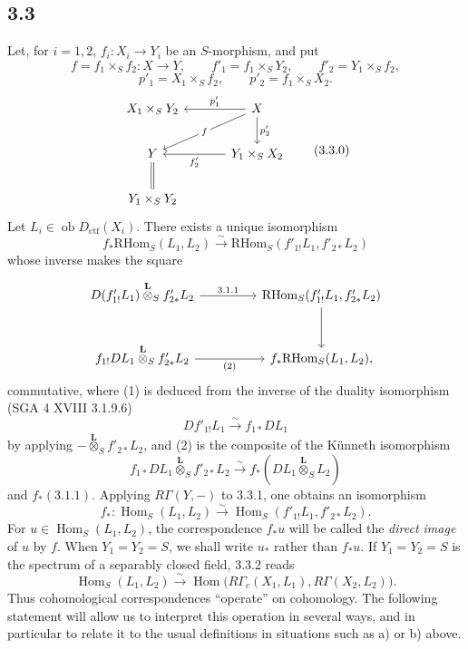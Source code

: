 \documentclass[11pt]{article}
\DeclareMathOperator{\Hom}{Hom}
\newcommand{\ob}{\operatorname{ob}}
\providecommand{\RHom}{\mathrm{RHom}}
\providecommand{\Dctf}{D_{\mathrm{ctf}}}
\providecommand{\Dctf}{D_{\mathrm{ctf}}}
\providecommand{\RHom}{\mathrm{RHom}}
\providecommand{\Hom}{\operatorname{Hom}}
\providecommand{\ob}{\operatorname{ob}}
\providecommand{\RHom}{\mathrm R\mathcal{H}om}
\providecommand{\RHom}{\mathrm{RHom}}
\begin{document}
\subsection*{3.3}
Let, for $i=1,2$, $f_i:X_i\to Y_i$ be an $S$-morphism, and put
\[
f=f_1\times_S f_2:X\to Y,
\qquad
f'_1=f_1\times_S Y_2,
\qquad
f'_2=Y_1\times_S f_2,
\]
\[
p'_1=X_1\times_S f_2,
\qquad
p'_2=f_1\times_S X_2.
\]
\begin{equation}
\begin{tikzcd}[column sep=3.3em,row sep=2.0em]
X_1\times_S Y_2 & X \arrow[l,"p'_1"'] \arrow[dl,"f" description] \arrow[d,"p'_2"] \\
Y & Y_1\times_S X_2 \arrow[l,"f'_2"] \\
Y_1\times_S Y_2 \arrow[u,equal] &
\end{tikzcd}
\tag{3.3.0}
\end{equation}
Let $L_i\in\ob\Dctf(X_i)$. There exists a unique isomorphism
\begin{equation}
f_*\RHom_S(L_1,L_2)
\xrightarrow{\sim}
\RHom_S(f'_{1!}L_1,f'_{2*}L_2)
\tag{3.3.1}
\end{equation}
whose inverse makes the square
\[
\begin{tikzcd}[column sep=4.5em,row sep=2.6em]
D(f'_{1!}L_1)\overset{\mathbf L}{\otimes}_S f'_{2*}L_2
  \arrow[r,"3.1.1"] 
& \RHom_S(f'_{1!}L_1,f'_{2*}L_2) \arrow[d] \\
f_{1!}DL_1\overset{\mathbf L}{\otimes}_S f'_{2*}L_2
  \arrow[r,"(2)"']
& f_*\RHom_S(L_1,L_2),
\end{tikzcd}
\]
commutative, where (1) is deduced from the inverse of the duality isomorphism (SGA 4 XVIII 3.1.9.6)
\[
Df'_{1!}L_1\xrightarrow{\sim}f_{1*}DL_1
\]
by applying $-\overset{\mathbf L}{\otimes}_S f'_{2*}L_2$, and (2) is the composite of the Künneth isomorphism
\[
f_{1*}DL_1\overset{\mathbf L}{\otimes}_S f'_{2*}L_2
\xrightarrow{\sim}
f_*(DL_1\overset{\mathbf L}{\otimes}_S L_2)
\]
and $f_*(3.1.1)$. Applying $R\Gamma(Y,-)$ to 3.3.1, one obtains an isomorphism
\begin{equation}
f_*:\Hom_S(L_1,L_2)
\xrightarrow{\sim}
\Hom_S(f'_{1!}L_1,f'_{2*}L_2).
\tag{3.3.2}
\end{equation}
For $u\in\Hom_S(L_1,L_2)$, the correspondence $f_*u$ will be called the \emph{direct image} of $u$ by $f$. When $Y_1=Y_2=S$, we shall write $u_*$ rather than $f_*u$. If $Y_1=Y_2=S$ is the spectrum of a separably closed field, 3.3.2 reads
\begin{equation}
\Hom_S(L_1,L_2)
\xrightarrow{\sim}
\Hom\bigl(R\Gamma_c(X_1,L_1),R\Gamma(X_2,L_2)\bigr).
\tag{3.3.3}
\end{equation}
Thus cohomological correspondences ``operate'' on cohomology. The following statement will allow us to interpret this operation in several ways, and in particular to relate it to the usual definitions in situations such as a) or b) above.
\end{document}
